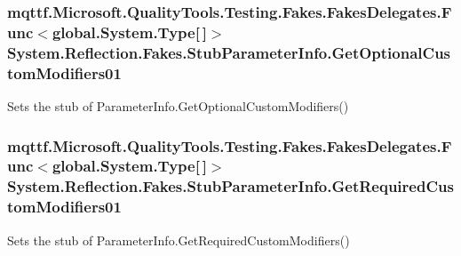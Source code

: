 \hypertarget{class_system_1_1_reflection_1_1_fakes_1_1_stub_parameter_info_a3efa788fc3d7f08da9edea48f1d15f0a}{
\subsubsection[{Get\-Optional\-Custom\-Modifiers01}]{\setlength{\rightskip}{0pt plus 5cm}mqttf.\-Microsoft.\-Quality\-Tools.\-Testing.\-Fakes.\-Fakes\-Delegates.\-Func$<$global.\-System.\-Type\mbox{[}$\,$\mbox{]}$>$ System.\-Reflection.\-Fakes.\-Stub\-Parameter\-Info.\-Get\-Optional\-Custom\-Modifiers01}}\label{class_system_1_1_reflection_1_1_fakes_1_1_stub_parameter_info_a3efa788fc3d7f08da9edea48f1d15f0a}


Sets the stub of Parameter\-Info.\-Get\-Optional\-Custom\-Modifiers()

\hypertarget{class_system_1_1_reflection_1_1_fakes_1_1_stub_parameter_info_aa87fcd631076bfcf031736c2fff6287f}{
\subsubsection[{Get\-Required\-Custom\-Modifiers01}]{\setlength{\rightskip}{0pt plus 5cm}mqttf.\-Microsoft.\-Quality\-Tools.\-Testing.\-Fakes.\-Fakes\-Delegates.\-Func$<$global.\-System.\-Type\mbox{[}$\,$\mbox{]}$>$ System.\-Reflection.\-Fakes.\-Stub\-Parameter\-Info.\-Get\-Required\-Custom\-Modifiers01}}\label{class_system_1_1_reflection_1_1_fakes_1_1_stub_parameter_info_aa87fcd631076bfcf031736c2fff6287f}


Sets the stub of Parameter\-Info.\-Get\-Required\-Custom\-Modifiers()

